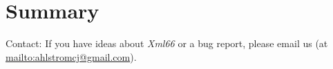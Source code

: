\documentclass[
 11pt,
 twoside,
 a4paper,
 final                                 %
]{article}
\begin{document}

% 
% 


\section{Summary}
\label{sec:summary}

   Contact: If you have ideas about \textsl{Xml66} or a bug report,
   please email us (at \url{mailto:ahlstromcj@gmail.com}).




\printindex
\end{document}
